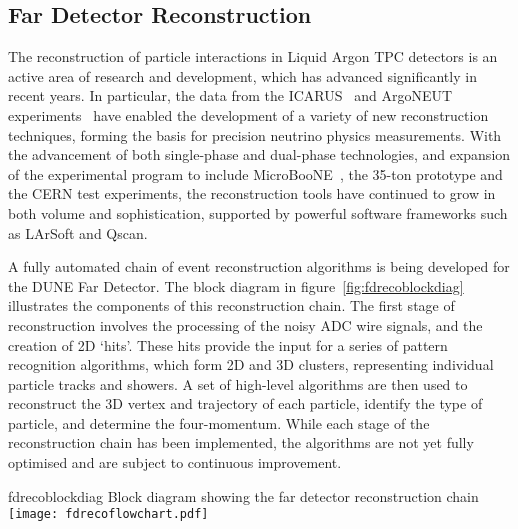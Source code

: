 \subsection{Far Detector Reconstruction}
\label{sec:detectors-sc-physics-software-reconstruction-fd}

The reconstruction of particle interactions in Liquid Argon TPC
detectors is an active area of research and development,
which has advanced significantly in recent years.
In particular, the data from the ICARUS~\cite{Amerio:2004ze,icarus-url,ICARUS-pizero,Antonello:2012hu} 
and ArgoNEUT experiments~\cite{Adamson:2013/02/28tla,argoneut-url,Acciarri:2013met}
have enabled the development of a variety of new reconstruction techniques,
forming the basis for precision neutrino physics measurements.
With the advancement of both single-phase and dual-phase technologies,
and expansion of the experimental program to include MicroBooNE~\cite{Chen:2007ae,microboone-url},
the 35-ton prototype and the CERN test experiments,
the reconstruction tools have continued to grow in both volume and sophistication,
supported by powerful software frameworks such as LArSoft and Qscan.


A fully automated chain of event reconstruction algorithms
is being developed for the DUNE Far Detector.
The block diagram in figure~\ref{fig:fdrecoblockdiag} illustrates 
the components of this reconstruction chain.
The first stage of reconstruction involves the processing of the
noisy ADC wire signals, and the creation of 2D `hits'. 
These hits provide the input for a series of pattern recognition algorithms,
which form 2D and 3D clusters, representing individual particle tracks and showers.
A set of high-level algorithms are then used to reconstruct the 
3D vertex and trajectory of each particle, identify the type of particle,
and determine the four-momentum.
While each stage of the reconstruction chain has been implemented,
the algorithms are not yet fully optimised and are subject to
continuous improvement.

\begin{cdrfigure}{fdrecoblockdiag}
{Block diagram showing the far detector reconstruction chain}
\texttt{[image: fdrecoflowchart.pdf]}
\end{cdrfigure}


